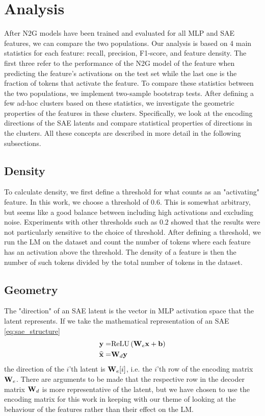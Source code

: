 \section{Analysis}
After N2G models have been trained and evaluated for all MLP and SAE features, we can compare the two populations.
Our analysis is based on 4 main statistics for each feature: recall, precision, F1-score, and feature density.
The first three refer to the performance of the N2G model of the feature when predicting the feature's activations on the test set while the last one is the fraction of tokens that activate the feature.
To compare these statistics between the two populations, we implement two-sample bootstrap tests.
After defining a few ad-hoc clusters based on these statistics, we investigate the geometric properties of the features in these clusters.
Specifically, we look at the encoding directions of the SAE latents and compare statistical properties of directions in the clusters.
All these concepts are described in more detail in the following subsections.

\subsection{Density}
\label{sec:density}
To calculate density, we first define a threshold for what counts as an "activating" feature.
In this work, we choose a threshold of $0.6$.
This is somewhat arbitrary, but seems like a good balance between including high activations and excluding noise.
Experiments with other thresholds such as $0.2$ showed that the results were not particularly sensitive to the choice of threshold.
After defining a threshold, we run the LM on the dataset and count the number of tokens where each feature has an activation above the threshold.
The density of a feature is then the number of such tokens divided by the total number of tokens in the dataset.

\subsection{Geometry}
\label{sec:geometry}
The "direction" of an SAE latent is the vector in MLP activation space that the latent represents.
If we take the mathematical representation of an SAE \eqref{eq:sae_structure} 
\begin{align*}
    \mathbf{y}=&\mathrm{ReLU}\left(\mathbf{W}_e\mathbf{x}+\mathbf{b}\right)\\
    \widehat{\mathbf{x}}=&\mathbf{W}_d\mathbf{y}
\end{align*}
the direction of the $i$'th latent is $\mathbf{W}_e[i]$, i.e. the $i$'th row of the encoding matrix $\mathbf{W}_e$.
There are arguments to be made\parencite{nanda_open_2023} that the respective row in the decoder matrix $\mathbf{W}_d$ is more representative of the latent, but we have chosen to use the encoding matrix for this work in keeping with our theme of looking at the behaviour of the features rather than their effect on the LM.


